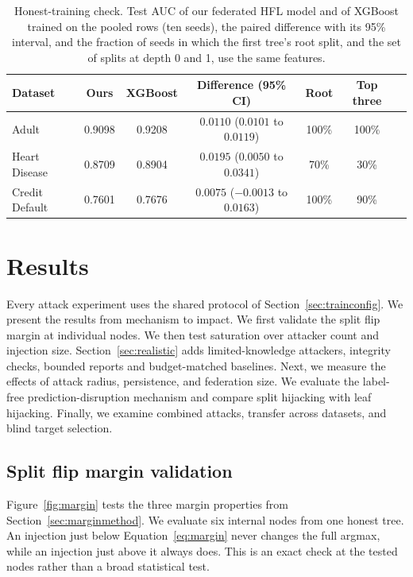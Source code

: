 \documentclass[11pt]{article}
\begin{document}
\begin{table}[htbp]
\centering
\small
\caption{Honest-training check. Test AUC of our federated HFL model and of XGBoost trained on the pooled rows (ten seeds), the paired difference with its 95\% interval, and the fraction of seeds in which the first tree's root split, and the set of splits at depth 0 and 1, use the same features.}\label{tab:xgbcheck}
\begin{tabular}{lcccccc}
\toprule
Dataset & Ours & XGBoost & Difference (95\% CI) & Root & Top three \\
\midrule
Adult & 0.9098 & 0.9208 & $0.0110$ ($0.0101$ to $0.0119$) & 100\% & 100\% \\
Heart Disease & 0.8709 & 0.8904 & $0.0195$ ($0.0050$ to $0.0341$) & 70\% & 30\% \\
Credit Default & 0.7601 & 0.7676 & $0.0075$ ($-0.0013$ to $0.0163$) & 100\% & 90\% \\
\bottomrule
\end{tabular}
\end{table}

\FloatBarrier

\section{Results}
\label{sec:experiments}

Every attack experiment uses the shared protocol of Section~\ref{sec:trainconfig}. We present the results from mechanism to impact. We first validate the split flip margin at individual nodes. We then test saturation over attacker count and injection size. Section~\ref{sec:realistic} adds limited-knowledge attackers, integrity checks, bounded reports and budget-matched baselines. Next, we measure the effects of attack radius, persistence, and federation size. We evaluate the label-free prediction-disruption mechanism and compare split hijacking with leaf hijacking. Finally, we examine combined attacks, transfer across datasets, and blind target selection.

\subsection{Split flip margin validation}
\label{sec:marginresults}

Figure~\ref{fig:margin} tests the three margin properties from Section~\ref{sec:marginmethod}. We evaluate six internal nodes from one honest tree. An injection just below Equation~\ref{eq:margin} never changes the full argmax, while an injection just above it always does. This is an exact check at the tested nodes rather than a broad statistical test.
\end{document}
